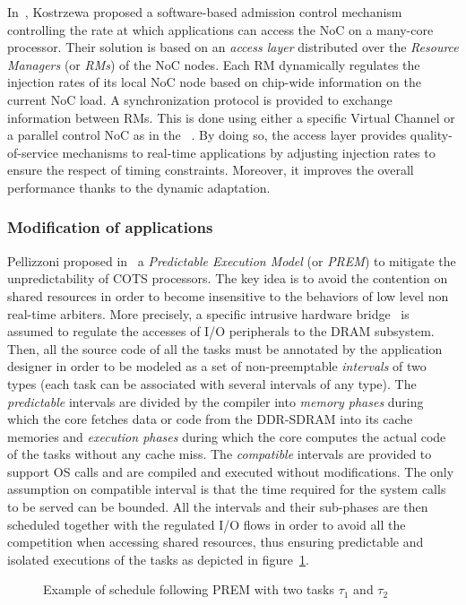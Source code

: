 \documentclass[main.tex]{subfiles}
\begin{document}
In~\cite{Kostrzewa2016}, Kostrzewa \etal proposed a software-based admission
control mechanism controlling the rate at which applications can access the NoC
on a many-core processor. Their solution is based on an \emph{access layer}
distributed over the \emph{Resource Managers}  (or \emph{RMs}) of the NoC
nodes. Each RM dynamically regulates the injection rates of its local NoC node
based on chip-wide information on the current NoC load. A synchronization
protocol is provided to exchange information between RMs. This is done using
either a specific Virtual Channel or a parallel control NoC as in the
\mppalong~\cite{kalray_mppa}. By doing so, the access layer provides
quality-of-service mechanisms to real-time applications by adjusting injection
rates to ensure the respect of timing constraints. Moreover, it improves the
overall performance thanks to the dynamic adaptation.



\subsubsection{Modification of applications}
Pellizzoni \etal proposed in~\cite{Pellizzoni2011_PREM} a \emph{Predictable
Execution Model} (or \emph{PREM}) to mitigate the unpredictability of COTS
processors. The key idea is to avoid the contention on shared resources in
order to become insensitive to the behaviors of low level non real-time
arbiters. More precisely, a specific intrusive hardware bridge~\cite{Betti13}
is assumed to regulate the accesses of I/O peripherals to the DRAM subsystem.
Then, all the source code of all the tasks must be annotated by the application
designer in order to be modeled as a set of non-preemptable \emph{intervals} of
two types (each task can be associated with several intervals of any type). The
\emph{predictable} intervals are divided by the compiler into \emph{memory
phases} during which the core fetches data or code from the DDR-SDRAM into its
cache memories and \emph{execution phases} during which the core computes the
actual code of the tasks without any cache miss. The \emph{compatible}
intervals are provided to support OS calls and are compiled and executed
without modifications. The only assumption on compatible interval is that the
time required for the system calls to be served can be bounded. All the
intervals and their sub-phases are then scheduled together with the regulated
I/O flows in order to avoid all the competition when accessing shared
resources, thus ensuring predictable and isolated executions of the tasks as
depicted in figure~\ref{fig_stateOfTheArt_PREM}. \\
\begin{figure}
    \centering
    
    \caption{Example of schedule following PREM with two tasks $\tau_1$ and $\tau_{2}$}
    \label{fig_stateOfTheArt_PREM}
\end{figure}
\end{document}
